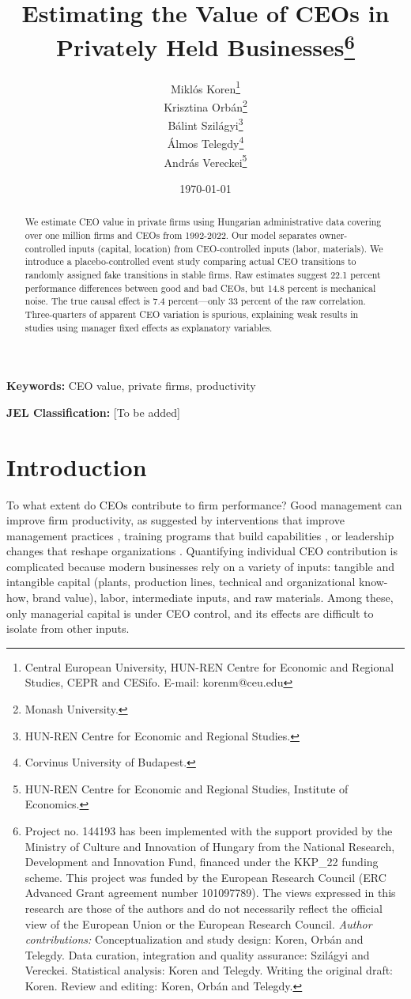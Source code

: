 \documentclass[11pt,a4paper]{article}
\title{Estimating the Value of CEOs in Privately Held Businesses\thanks{Project no. 144193 has been implemented with the support provided by the Ministry of Culture and Innovation of Hungary from the National Research, Development and Innovation Fund, financed under the KKP\_22 funding scheme. This project was funded by the European Research Council (ERC Advanced Grant agreement number 101097789). The views expressed in this research are those of the authors and do not necessarily reflect the official view of the European Union or the European Research Council. \emph{Author contributions:} Conceptualization and study design: Koren, Orbán and Telegdy. Data curation, integration and quality assurance: Szilágyi and Vereckei. Statistical analysis: Koren and Telegdy. Writing the original draft: Koren. Review and editing: Koren, Orbán and Telegdy.}}
\author{Miklós Koren\thanks{Central European University, HUN-REN Centre for Economic and Regional Studies, CEPR and CESifo. E-mail: korenm@ceu.edu} \\
        Krisztina Orbán\thanks{Monash University.} \\
        Bálint Szilágyi\thanks{HUN-REN Centre for Economic and Regional Studies.} \\
        Álmos Telegdy\thanks{Corvinus University of Budapest.} \\
        András Vereckei\thanks{HUN-REN Centre for Economic and Regional Studies, Institute of Economics.}}
\date{\today}
\begin{document}
\maketitle

\begin{abstract}
We estimate CEO value in private firms using Hungarian administrative data covering over one million firms and CEOs from 1992-2022. Our model separates owner-controlled inputs (capital, location) from CEO-controlled inputs (labor, materials). We introduce a placebo-controlled event study comparing actual CEO transitions to randomly assigned fake transitions in stable firms. Raw estimates suggest 22.1 percent performance differences between good and bad CEOs, but 14.8 percent is mechanical noise. The true causal effect is 7.4 percent—only 33 percent of the raw correlation. Three-quarters of apparent CEO variation is spurious, explaining weak results in studies using manager fixed effects as explanatory variables.
\end{abstract}

\textbf{Keywords:} CEO value, private firms, productivity

\textbf{JEL Classification:} [To be added]

\newpage

\section{Introduction}

To what extent do CEOs contribute to firm performance? Good management can improve firm productivity, as suggested by interventions that improve management practices \citep{bloom2013does}, training programs that build capabilities \citep{mckenzie2021small}, or leadership changes that reshape organizations \citep{Bertrand2003-io,bennedsen2020ceos,metcalfe2023managers}. Quantifying individual CEO contribution is complicated because modern businesses rely on a variety of inputs: tangible and intangible capital (plants, production lines, technical and organizational know-how, brand value), labor, intermediate inputs, and raw materials. Among these, only managerial capital is under CEO control, and its effects are difficult to isolate from other inputs.
\end{document}
